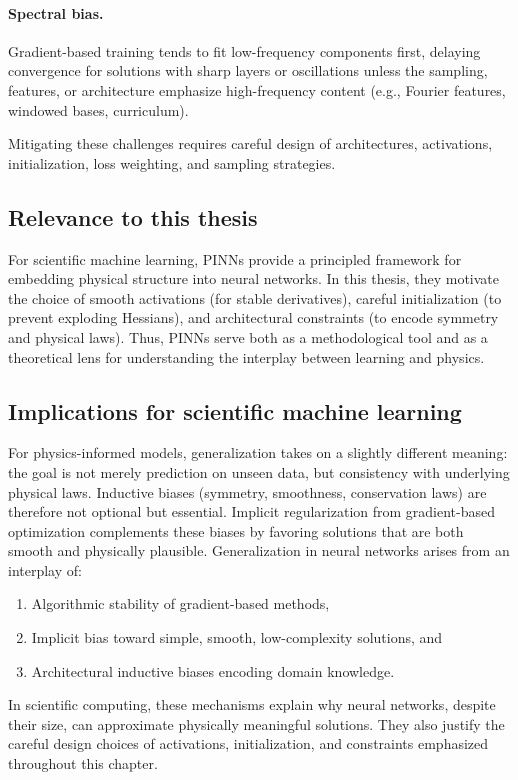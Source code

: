 \paragraph{Spectral bias.}
Gradient-based training tends to fit low-frequency components first, delaying convergence for solutions with sharp layers or oscillations unless the sampling, features, or architecture emphasize high-frequency content (e.g., Fourier features, windowed bases, curriculum).

\medskip
Mitigating these challenges requires careful design of architectures, activations, initialization, loss weighting, and sampling strategies.

\subsection{Relevance to this thesis}
For scientific machine learning, PINNs provide a principled framework 
for embedding physical structure into neural networks. In this thesis, 
they motivate the choice of smooth activations (for stable derivatives), 
careful initialization (to prevent exploding Hessians), and architectural 
constraints (to encode symmetry and physical laws).  
Thus, PINNs serve both as a methodological tool and as a theoretical lens 
for understanding the interplay between learning and physics.  

\subsection{Implications for scientific machine learning}
For physics-informed models, generalization takes on a slightly different meaning: 
the goal is not merely prediction on unseen data, but consistency with 
underlying physical laws. Inductive biases (symmetry, smoothness, conservation laws) 
are therefore not optional but essential. Implicit regularization from 
gradient-based optimization complements these biases by favoring solutions 
that are both smooth and physically plausible. Generalization in neural networks arises from an interplay of:
\begin{enumerate}
  \item Algorithmic stability of gradient-based methods,  
  \item Implicit bias toward simple, smooth, low-complexity solutions, and  
  \item Architectural inductive biases encoding domain knowledge.  
\end{enumerate}
In scientific computing, these mechanisms explain why neural networks, 
despite their size, can approximate physically meaningful solutions.  
They also justify the careful design choices of activations, initialization, 
and constraints emphasized throughout this chapter.  

